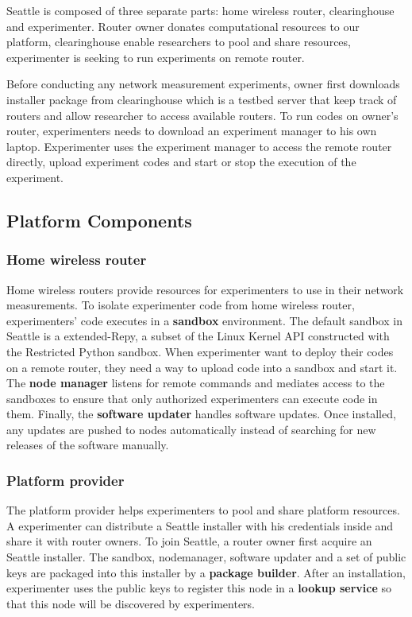 Seattle is composed of three separate parts: home wireless router, clearinghouse and experimenter. Router owner donates computational resources to our platform, clearinghouse enable researchers to pool and share resources, experimenter is seeking to run experiments on remote router.

Before conducting any network measurement experiments, owner first downloads installer package from clearinghouse which is a testbed server that keep track of routers and allow researcher to access available routers. To run codes on owner's router, experimenters needs to download an experiment manager to his own laptop. Experimenter uses the experiment manager to access the remote router directly, upload experiment codes and start or stop the execution of the experiment.

\subsection{Platform Components}
\subsubsection{Home wireless router}
Home wireless routers provide resources for experimenters to use in their network measurements. To isolate experimenter code from home wireless router, experimenters' code executes in a \textbf{sandbox} environment. The default sandbox in Seattle is a extended-Repy, a subset of the Linux Kernel API constructed with the Restricted Python sandbox. When experimenter want to deploy their codes on a remote router, they need a way to upload code into a sandbox and start it. The \textbf{node manager} listens for remote commands and mediates access to the sandboxes to ensure that only authorized experimenters can execute code in them. Finally, the \textbf{software updater} handles software updates. Once installed, any updates are pushed to nodes automatically instead of searching for new releases of the software manually.  
\subsubsection{Platform provider}
The platform provider helps experimenters to pool and share platform resources. A experimenter can distribute a Seattle installer with his credentials inside and share it with router owners. To join Seattle, a router owner first acquire an Seattle installer. The sandbox, nodemanager, software updater and a set of public keys are packaged into this installer by a \textbf{package builder}. After an installation, experimenter uses the public keys to register this node in a \textbf{lookup service} so that this node will be discovered by experimenters.

